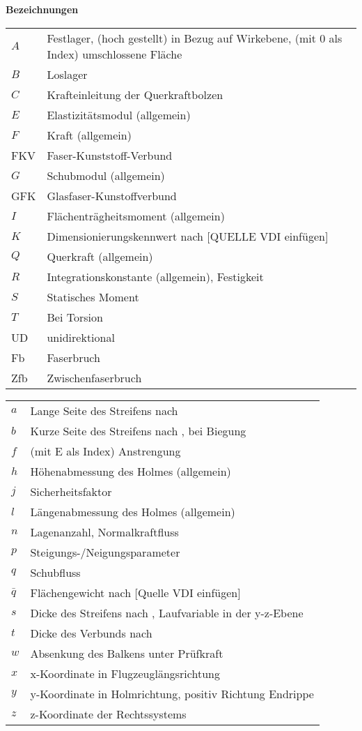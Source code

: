 \textbf{Bezeichnungen}
\begin{table}[h]

\begin{tabular}{ll}
	$ A $&Festlager, (hoch gestellt) in Bezug auf Wirkebene, (mit 0 als Index) umschlossene Fläche\\
	$ B $&Loslager\\
	$ C $&Krafteinleitung der Querkraftbolzen\\
	$ E $&Elastizitätsmodul (allgemein)\\
	$ F $&Kraft (allgemein)\\
	FKV&Faser-Kunststoff-Verbund\\
	$ G $&Schubmodul (allgemein)\\
	GFK& Glasfaser-Kunstoffverbund\\
	$ I $&Flächenträgheitsmoment (allgemein)\\
	$ K $&Dimensionierungskennwert nach [QUELLE VDI einfügen]\\
	$ Q $&Querkraft (allgemein)\\
	$ R $&Integrationskonstante (allgemein), Festigkeit\\
	$ S $&Statisches Moment\\
	$ T $&Bei Torsion\\
	UD&unidirektional\\
	Fb&Faserbruch\\
	Zfb&Zwischenfaserbruch\\
	
\end{tabular}
\end{table}

\begin{table}[h]
	\begin{tabular}{ll}
		$ a $&Lange Seite des Streifens nach \cite{item1}\\
		$ b $&Kurze Seite des Streifens nach \cite{item1}, bei Biegung\\
		$ f $&(mit E als Index) Anstrengung\\
		$ h $&Höhenabmessung des Holmes (allgemein)\\
		$ j $&Sicherheitsfaktor\\
		$ l $&Längenabmessung des Holmes (allgemein)\\
		$ n $&Lagenanzahl, Normalkraftfluss\\
		$ p $&Steigungs-/Neigungsparameter\\
		$ q $&Schubfluss\\
		$ \bar{q} $&Flächengewicht nach [Quelle VDI einfügen]\\
		$ s $&Dicke des Streifens nach \cite{item1}, Laufvariable in der	y-z-Ebene\\
		$ t $&Dicke des Verbunds nach \cite{item3}\\
		$ w $&Absenkung des Balkens unter Prüfkraft\\
		$ x $&x-Koordinate in Flugzeuglängsrichtung\\
		$ y $&y-Koordinate in Holmrichtung, positiv Richtung Endrippe\\
		$ z $&z-Koordinate der Rechtssystems\\
		
	\end{tabular}
\end{table}

